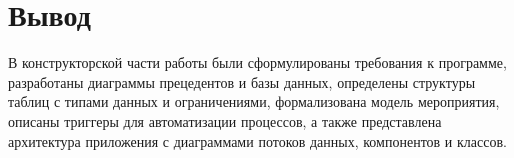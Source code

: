 \section{Вывод}

В конструкторской части работы были сформулированы требования к программе, разработаны диаграммы прецедентов и базы данных, определены структуры таблиц с типами данных и ограничениями, формализована модель мероприятия, описаны триггеры для автоматизации процессов, а также представлена архитектура приложения с диаграммами потоков данных, компонентов и классов.

\clearpage

